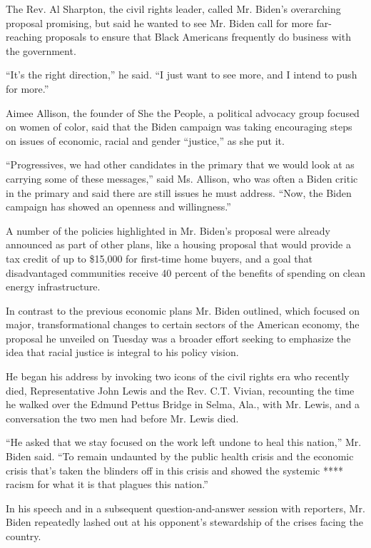 The Rev. Al Sharpton, the civil rights leader, called Mr. Biden's
overarching proposal promising, but said he wanted to see Mr. Biden call
for more far-reaching proposals to ensure that Black Americans
frequently do business with the government.

``It's the right direction,'' he said. ``I just want to see more, and I
intend to push for more.''

Aimee Allison, the founder of She the People, a political advocacy group
focused on women of color, said that the Biden campaign was taking
encouraging steps on issues of economic, racial and gender ``justice,''
as she put it.

``Progressives, we had other candidates in the primary that we would
look at as carrying some of these messages,'' said Ms. Allison, who was
often a Biden critic in the primary and said there are still issues he
must address. ``Now, the Biden campaign has showed an openness and
willingness.''

A number of the policies highlighted in Mr. Biden's proposal were
already announced as part of other plans, like a housing proposal that
would provide a tax credit of up to \$15,000 for first-time home buyers,
and a goal that disadvantaged communities receive 40 percent of the
benefits of spending on clean energy infrastructure.

In contrast to the previous economic plans Mr. Biden outlined, which
focused on major, transformational changes to certain sectors of the
American economy, the proposal he unveiled on Tuesday was a broader
effort seeking to emphasize the idea that racial justice is integral to
his policy vision.

He began his address by invoking two icons of the civil rights era who
recently died, Representative John Lewis and the Rev. C.T. Vivian,
recounting the time he walked over the Edmund Pettus Bridge in Selma,
Ala., with Mr. Lewis, and a conversation the two men had before Mr.
Lewis died.

``He asked that we stay focused on the work left undone to heal this
nation,'' Mr. Biden said. ``To remain undaunted by the public health
crisis and the economic crisis that's taken the blinders off in this
crisis and showed the systemic **** racism for what it is that plagues
this nation.''

In his speech and in a subsequent question-and-answer session with
reporters, Mr. Biden repeatedly lashed out at his opponent's stewardship
of the crises facing the country.

